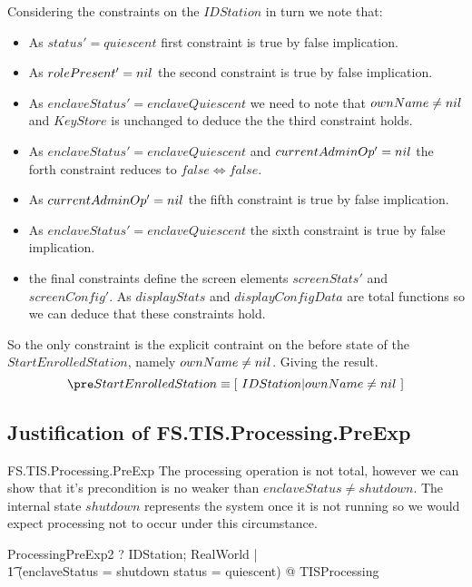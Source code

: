 Considering the constraints on the $IDStation$ in turn we note that:
\begin{itemize}
\item
As $status' = quiescent$ first constraint is true by false
implication.
\item
As $rolePresent' = nil$ the second constraint is true by false
implication.
\item
As $enclaveStatus' = enclaveQuiescent$  we need to note that $ownName
\neq nil$ and $KeyStore$ is unchanged to deduce the the third
constraint holds.
\item
As $enclaveStatus' = enclaveQuiescent$ and $currentAdminOp' = nil$ the forth
constraint reduces to $false \iff false$.
\item
As $currentAdminOp' = nil$ the fifth constraint is true by false implication.
\item
As $enclaveStatus' = enclaveQuiescent$ the sixth constraint is true by false
implication.
\item
the final constraints define the screen elements $screenStats'$ and
$screenConfig'$. As $displayStats$ and $displayConfigData$ are total
functions so we can deduce that these constraints hold.
\end{itemize}

So the only constraint is the explicit contraint on the before state
of the $StartEnrolledStation$, namely $ownName \neq nil$. Giving the
result.
\[
\pre StartEnrolledStation \equiv [~ IDStation | ownName \neq \Nil ~] 
\]

\subsection{Justification of FS.TIS.Processing.PreExp}

\begin{Zpobtrace}{FS.TIS.Processing.PreExp}
The processing operation is not total, however we can show that it's precondition
is no weaker than $enclaveStatus \neq shutdown$. The internal state
$shutdown$ represents the system once it is not running so we would
expect processing not to occur under this circumstance. 

\begin{theorem}
 ProcessingPreExp2 \vdash? \forall       IDStation; RealWorld | 
\\ \t1 \lnot (enclaveStatus = shutdown \land status = quiescent) @ \pre TISProcessing
\end{theorem}
\end{Zpobtrace}

